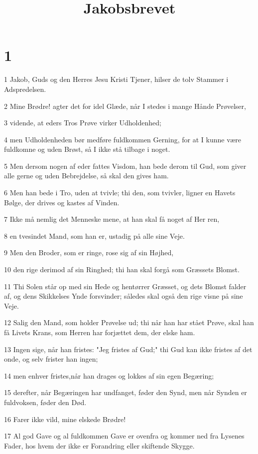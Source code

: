 

\title{Jakobsbrevet}


\chapter{1}

\par 1 Jakob, Guds og den Herres Jesu Kristi Tjener, hilser de tolv Stammer i Adspredelsen.
\par 2 Mine Brødre! agter det for idel Glæde, når I stedes i mange Hånde Prøvelser,
\par 3 vidende, at eders Tros Prøve virker Udholdenhed;
\par 4 men Udholdenheden bør medføre fuldkommen Gerning, for at I kunne være fuldkomne og uden Brøst, så I ikke stå tilbage i noget.
\par 5 Men dersom nogen af eder fattes Visdom, han bede derom til Gud, som giver alle gerne og uden Bebrejdelse, så skal den gives ham.
\par 6 Men han bede i Tro, uden at tvivle; thi den, som tvivler, ligner en Havets Bølge, der drives og kastes af Vinden.
\par 7 Ikke må nemlig det Menneske mene, at han skal få noget af Her ren,
\par 8 en tvesindet Mand, som han er, ustadig på alle sine Veje.
\par 9 Men den Broder, som er ringe, rose sig af sin Højhed,
\par 10 den rige derimod af sin Ringhed; thi han skal forgå som Græssets Blomst.
\par 11 Thi Solen står op med sin Hede og hentørrer Græsset, og dets Blomst falder af, og dens Skikkelses Ynde forsvinder; således skal også den rige visne på sine Veje.
\par 12 Salig den Mand, som holder Prøvelse ud; thi når han har stået Prøve, skal han få Livets Krans, som Herren har forjættet dem, der elske ham.
\par 13 Ingen sige, når han fristes: "Jeg fristes af Gud;" thi Gud kan ikke fristes af det onde, og selv frister han ingen;
\par 14 men enhver fristes,når han drages og lokkes af sin egen Begæring;
\par 15 derefter, når Begæringen har undfanget, føder den Synd, men når Synden er fuldvoksen, føder den Død.
\par 16 Farer ikke vild, mine elskede Brødre!
\par 17 Al god Gave og al fuldkommen Gave er ovenfra og kommer ned fra Lysenes Fader, hos hvem der ikke er Forandring eller skiftende Skygge.
